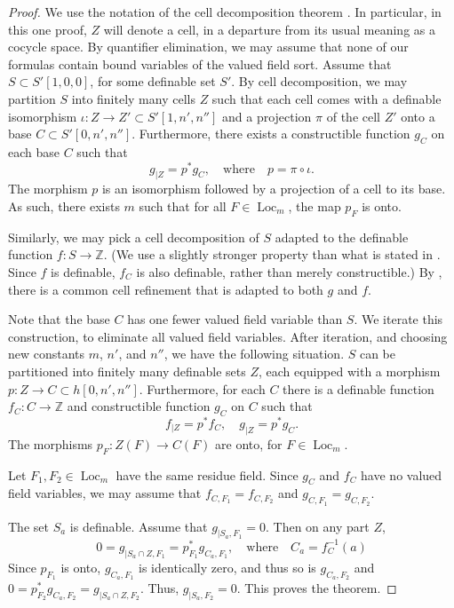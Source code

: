 \documentclass[12pt]{amsart}
\newcommand{\op}[1]{\operatorname{#1}}
\newcommand{\ring}[1]{{\mathbb #1}}
\theoremstyle{plain}
\theoremstyle{definition}
\begin{document}
\begin{proof} We use the notation of the cell decomposition theorem
  \cite[Theorem 7.2.1]{CL}.  In particular, in this one proof, $Z$
  will denote a cell, in a departure from its usual meaning as a
  cocycle space.  By quantifier elimination, we may assume that none
  of our formulas contain bound variables of the valued field sort.
  Assume that $S\subset S'[1,0,0]$, for some definable set $S'$.  By
  cell decomposition, we may partition $S$ into finitely many cells
  $Z$ such that each cell comes with a definable isomorphism
  $\iota:Z \to Z'\subset S'[1,n',n'']$ and a projection $\pi$ of the
  cell $Z'$ onto a base $C\subset S'[0,n',n'']$.  Furthermore, there
  exists a constructible function $g_C$ on each base $C$ such that
\[
g_{|Z} = p^* g_C, \quad\text{where}\quad p = \pi\circ\iota.
\]
The morphism $p$ is an isomorphism followed by a
projection of a cell to its base.  As such, there exists $m$ such that
for all $F\in \op{Loc}_m$, the map $p_F$ is onto.

Similarly, we may pick a cell decomposition of $S$ adapted to the
definable function $f:S\to \ring{Z}$.  (We use a slightly stronger
property than what is stated in \cite{CL}.  Since $f$ is definable,
$f_C$ is also definable, rather than merely constructible.)  By
\cite[Prop 7.3.2]{CL}, there is a common cell refinement that is
adapted to both $g$ and $f$.

Note that the base $C$ has one fewer valued field variable than $S$.
We iterate this construction, to eliminate all valued field variables.
After iteration, and choosing new constants $m$, $n'$, and $n''$, we
have the following situation.  $S$ can be partitioned into finitely
many definable sets $Z$, each equipped with a morphism $p:Z\to
C\subset h[0,n',n'']$.  Furthermore, for each $C$ there is a definable
function $f_C:C\to\ring{Z}$ and constructible function $g_C$ on $C$
such that
\[
f_{|Z} = p^* f_C,\quad  g_{|Z} = p^* g_C.
\]
The morphisms $p_F:Z(F)\to C(F)$ are onto, for $F\in\op{Loc}_m$.

Let $F_1,F_2\in\op{Loc}_m$ have the same residue field.  Since $g_C$ and
$f_C$ have no valued field variables, we may assume that $f_{C,F_1} =
f_{C,F_2}$ and $g_{C,F_1} = g_{C,F_2}$.

The set $S_a$ is definable.  Assume that $g_{|S_a,F_1} = 0$.  Then on
any part $Z$,
\[
0 = g_{|S_a\cap Z,F_1} = p^*_{F_1} g_{C_a,F_1}, 
\quad\text{where}\quad C_a = f_C^{-1}(a)
\]
Since $p_{F_1}$ is onto, $g_{C_a,F_1}$ is identically zero, and thus
so is $g_{C_a,F_2}$ and $0 = p^*_{F_2} g_{C_a,F_2} = g_{|S_a\cap
  Z,F_2}$.  Thus, $g_{|S_a,F_2}=0$.  This proves the theorem.
\end{proof}
\end{document}

